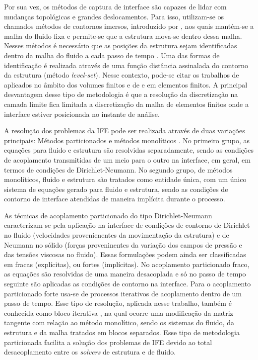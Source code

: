 \documentclass[tese_patricia.tex]{subfiles}
\begin{document}
Por sua vez, os métodos de captura de interface são capazes de lidar com mudanças topológicas e grandes deslocamentos. Para isso, utilizam-se os chamados métodos de contornos imersos, introduzido por , nos quais mantém-se a malha do fluido fixa e permite-se que a estrutura mova-se dentro dessa malha. Nesses métodos é necessário que as posições da estrutura sejam identificadas dentro da malha do fluido a cada passo de tempo \cite{MittalI:2005,WangRGF:2011}. Uma das formas de identificação é realizada através de uma função distância assinalada do contorno da estrutura (método \textit{level-set}). Nesse contexto, pode-se citar os trabalhos de   aplicados no âmbito dos volumes finitos e de  e  em elementos finitos. A principal desvantagem desse tipo de metodologia é que a resolução da discretização na camada limite fica limitada a discretização da malha de elementos finitos onde a interface estiver posicionada no instante de análise.

A resolução dos problemas da IFE pode ser realizada através de duas variações principais: Métodos particionados \cite{RouxG:2009,BazilevsHKWB:2011, SanchesC:2013,SanchesC:2014,FernandesCS:2019} e métodos monolíticos \cite{Blom:1998,Hubneretal:2004,HronM:2007,Avancini:2023}. No primeiro grupo, as equações para fluido e estrutura são resolvidas separadamente, sendo as condições de acoplamento transmitidas de um meio para o outro na interface, em geral, em termos de condições de Dirichlet-Neumann. No segundo grupo, de métodos monolíticos, fluido e estrutura são tratados como entidade única, com um único sistema de equações gerado para fluido e estrutura, sendo as condições de contorno de interface atendidas de maneira implícita durante o processo.

As técnicas de acoplamento particionado do tipo Dirichlet-Neumann caracterizam-se pela aplicação na interface de condições de contorno de Dirichlet no fluido (velocidades provenienentes da movimentação da estrutura) e de Neumann no sólido (forças proveninentes da variação dos campos de pressão e das tensões viscosas no fluido). Essas formulações podem ainda ser classificadas em fracas (explícitas), ou fortes (implícitas). No acoplamento particionado fraco, as equações são resolvidas de uma maneira desacoplada e só no passo de tempo seguinte são aplicadas as condições de contorno na interface. Para o acoplamento particionado forte usa-se de processos iterativos de acoplamento dentro de um passo de tempo. Esse tipo de resolução, aplicada nesse trabalho, também é conhecida como bloco-iterativa \cite{BazilevsTT:2013}, na qual ocorre uma modificação da matriz tangente com relação ao método monolítico, sendo os sistemas do fluido, da estrutura e da malha tratados em blocos separados. Esse tipo de metodologia particionada facilita a solução dos problemas de IFE devido ao total desacoplamento entre os \textit{solvers} de estrutura e de fluido.
\end{document}

